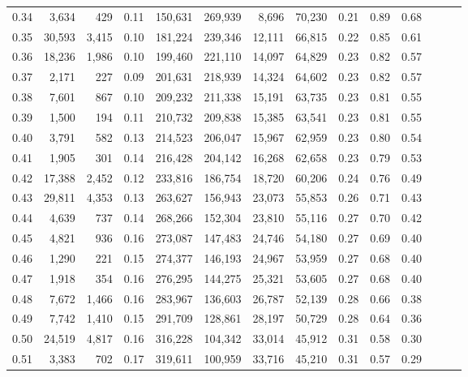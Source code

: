 \begin{tabular}{rrrrrrrrrrrrrr}
0.34 &   3,634 &    429 &  0.11 &  150,631 &  269,939 &   8,696 &  70,230 &  0.21 &  0.89 &      0.68 \\
0.35 &  30,593 &  3,415 &  0.10 &  181,224 &  239,346 &  12,111 &  66,815 &  0.22 &  0.85 &      0.61 \\
0.36 &  18,236 &  1,986 &  0.10 &  199,460 &  221,110 &  14,097 &  64,829 &  0.23 &  0.82 &      0.57 \\
0.37 &   2,171 &    227 &  0.09 &  201,631 &  218,939 &  14,324 &  64,602 &  0.23 &  0.82 &      0.57 \\
0.38 &   7,601 &    867 &  0.10 &  209,232 &  211,338 &  15,191 &  63,735 &  0.23 &  0.81 &      0.55 \\
0.39 &   1,500 &    194 &  0.11 &  210,732 &  209,838 &  15,385 &  63,541 &  0.23 &  0.81 &      0.55 \\
0.40 &   3,791 &    582 &  0.13 &  214,523 &  206,047 &  15,967 &  62,959 &  0.23 &  0.80 &      0.54 \\
0.41 &   1,905 &    301 &  0.14 &  216,428 &  204,142 &  16,268 &  62,658 &  0.23 &  0.79 &      0.53 \\
0.42 &  17,388 &  2,452 &  0.12 &  233,816 &  186,754 &  18,720 &  60,206 &  0.24 &  0.76 &      0.49 \\
0.43 &  29,811 &  4,353 &  0.13 &  263,627 &  156,943 &  23,073 &  55,853 &  0.26 &  0.71 &      0.43 \\
0.44 &   4,639 &    737 &  0.14 &  268,266 &  152,304 &  23,810 &  55,116 &  0.27 &  0.70 &      0.42 \\
0.45 &   4,821 &    936 &  0.16 &  273,087 &  147,483 &  24,746 &  54,180 &  0.27 &  0.69 &      0.40 \\
0.46 &   1,290 &    221 &  0.15 &  274,377 &  146,193 &  24,967 &  53,959 &  0.27 &  0.68 &      0.40 \\
0.47 &   1,918 &    354 &  0.16 &  276,295 &  144,275 &  25,321 &  53,605 &  0.27 &  0.68 &      0.40 \\
0.48 &   7,672 &  1,466 &  0.16 &  283,967 &  136,603 &  26,787 &  52,139 &  0.28 &  0.66 &      0.38 \\
0.49 &   7,742 &  1,410 &  0.15 &  291,709 &  128,861 &  28,197 &  50,729 &  0.28 &  0.64 &      0.36 \\
0.50 &  24,519 &  4,817 &  0.16 &  316,228 &  104,342 &  33,014 &  45,912 &  0.31 &  0.58 &      0.30 \\
0.51 &   3,383 &    702 &  0.17 &  319,611 &  100,959 &  33,716 &  45,210 &  0.31 &  0.57 &      0.29 \\

\end{tabular}
